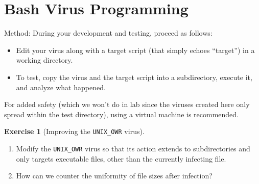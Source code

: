 \documentclass[a4paper,11pt]{article}
\theoremstyle{plain}
\theoremstyle{definition}
\newtheorem{exercice}{Exercise}
\begin{document}

\section{Bash Virus Programming}

{\Large Method:} During your development and testing, proceed as follows:
\begin{itemize}
\item Edit your virus along with a target script (that simply echoes ``target'') in a working directory.
\item To test, copy the virus and the target script into a subdirectory, execute it, and analyze what happened.
\end{itemize}
For added safety (which we won't do in lab since the viruses created here only spread within the test directory), using a virtual machine is recommended.



\begin{exercice}[Improving the \texttt{UNIX\_OWR} virus]$\;$

\begin{enumerate}
\item Modify the \texttt{UNIX\_OWR} virus so that its action extends to subdirectories and only targets executable files, other than the currently infecting file.
\item How can we counter the uniformity of file sizes after infection?
\end{enumerate}
\end{exercice}
\end{document}
